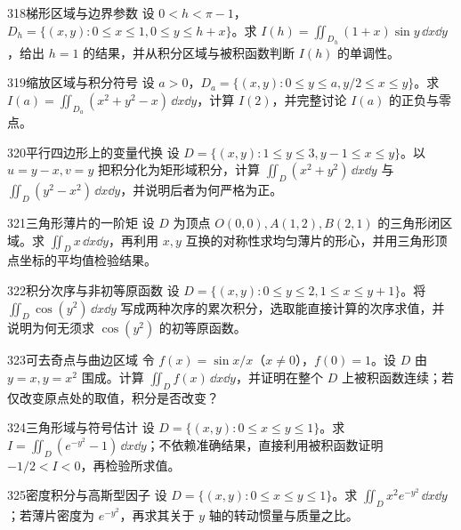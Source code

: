 \begin{exercise}{318}{梯形区域与边界参数}
设 $0<h<\pi-1$，$D_h=\{(x,y):0\leq x\leq1,0\leq y\leq h+x\}$。求 $I(h)=\iint_{D_h}(1+x)\sin y\,\dd x\dd y$，给出 $h=1$ 的结果，并从积分区域与被积函数判断 $I(h)$ 的单调性。
\end{exercise}

\begin{exercise}{319}{缩放区域与积分符号}
设 $a>0$，$D_a=\{(x,y):0\leq y\leq a,y/2\leq x\leq y\}$。求
$I(a)=\iint_{D_a}(x^2+y^2-x)\,\dd x\dd y$，计算 $I(2)$，并完整讨论 $I(a)$ 的正负与零点。
\end{exercise}

\begin{exercise}{320}{平行四边形上的变量代换}
设 $D=\{(x,y):1\leq y\leq3,y-1\leq x\leq y\}$。以 $u=y-x,v=y$ 把积分化为矩形域积分，计算 $\iint_D(x^2+y^2)\,\dd x\dd y$ 与 $\iint_D(y^2-x^2)\,\dd x\dd y$，并说明后者为何严格为正。
\end{exercise}

\begin{exercise}{321}{三角形薄片的一阶矩}
设 $D$ 为顶点 $O(0,0),A(1,2),B(2,1)$ 的三角形闭区域。求 $\iint_Dx\,\dd x\dd y$，再利用 $x,y$ 互换的对称性求均匀薄片的形心，并用三角形顶点坐标的平均值检验结果。
\end{exercise}

\begin{exercise}{322}{积分次序与非初等原函数}
设 $D=\{(x,y):0\leq y\leq2,1\leq x\leq y+1\}$。将 $\iint_D\cos(y^2)\,\dd x\dd y$ 写成两种次序的累次积分，选取能直接计算的次序求值，并说明为何无须求 $\cos(y^2)$ 的初等原函数。
\end{exercise}

\begin{exercise}{323}{可去奇点与曲边区域}
令 $f(x)=\sin x/x$（$x\ne0$），$f(0)=1$。设 $D$ 由 $y=x,y=x^2$ 围成。计算 $\iint_Df(x)\,\dd x\dd y$，并证明在整个 $D$ 上被积函数连续；若仅改变原点处的取值，积分是否改变？
\end{exercise}

\begin{exercise}{324}{三角形域与符号估计}
设 $D=\{(x,y):0\leq x\leq y\leq1\}$。求 $I=\iint_D(e^{-y^2}-1)\,\dd x\dd y$；不依赖准确结果，直接利用被积函数证明 $-1/2<I<0$，再检验所求值。
\end{exercise}

\begin{exercise}{325}{密度积分与高斯型因子}
设 $D=\{(x,y):0\leq x\leq y\leq1\}$。求 $\iint_Dx^2e^{-y^2}\,\dd x\dd y$；若薄片密度为 $e^{-y^2}$，再求其关于 $y$ 轴的转动惯量与质量之比。
\end{exercise}

